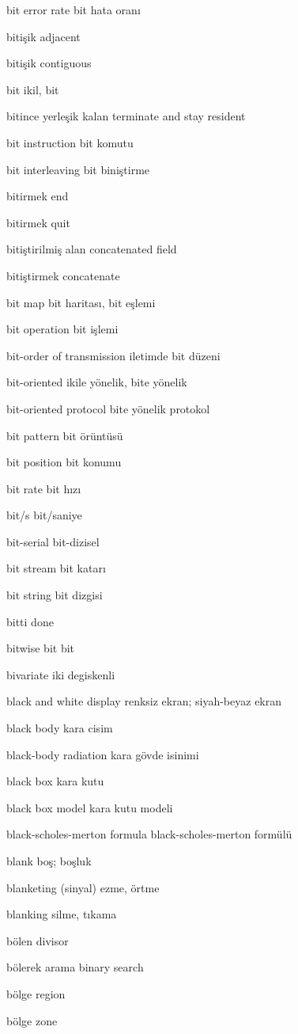 \documentclass[12pt,fleqn]{article}\usepackage{../../common}
\begin{document}
bit error rate bit hata oranı

bitişik adjacent

bitişik contiguous

bit ikil, bit

bitince yerleşik kalan terminate and stay resident

bit instruction bit komutu

bit interleaving bit biniştirme

bitirmek end

bitirmek quit

bitiştirilmiş alan concatenated field

bitiştirmek concatenate

bit map bit haritası, bit eşlemi

bit operation bit işlemi

bit-order of transmission iletimde bit düzeni

bit-oriented ikile yönelik, bite yönelik

bit-oriented protocol bite yönelik protokol

bit pattern bit örüntüsü

bit position bit konumu

bit rate bit hızı

bit/s bit/saniye

bit-serial bit-dizisel

bit stream bit katarı

bit string bit dizgisi

bitti done

bitwise bit bit

bivariate iki degiskenli

black and white display renksiz ekran; siyah-beyaz ekran

black body kara cisim

black-body radiation kara gövde isinimi

black box kara kutu

black box model kara kutu modeli

black-scholes-merton formula black-scholes-merton formülü

blank boş; boşluk

blanketing (sinyal) ezme, örtme

blanking silme, tıkama

bölen divisor

bölerek arama binary search

bölge region

bölge zone
\end{document}
